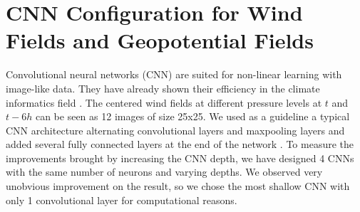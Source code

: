 \section{CNN Configuration for Wind Fields and Geopotential Fields}
Convolutional neural networks (CNN) are suited for non-linear learning with image-like data. They have already shown their efficiency in the climate informatics field \cite{xingjian2015convolutional, de2017deep,racah2017extremeweather}. The centered wind fields at different pressure levels at $t$ and $t-6h$ can be seen as 12 images of size 25x25. We used as a guideline a typical CNN architecture alternating convolutional layers and maxpooling layers and added several fully connected layers at the end of the network \cite{simonyan2014very}. To measure the improvements brought by increasing the CNN depth, we have designed 4 CNNs with the same number of neurons and varying depths. We observed very unobvious improvement on the result, so we chose the most shallow CNN with only 1 convolutional layer for computational reasons.


